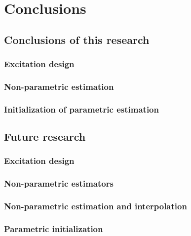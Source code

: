 \chapter{Conclusions}

\section{Conclusions of this research}

  \subsection{Excitation design}
  \subsection{Non-parametric estimation}
  \subsection{Initialization of parametric estimation}


\section{Future research}
  \subsection{Excitation design}

  \subsection{Non-parametric estimators}

  \subsection{Non-parametric estimation and interpolation}

  \subsection{Parametric initialization}

